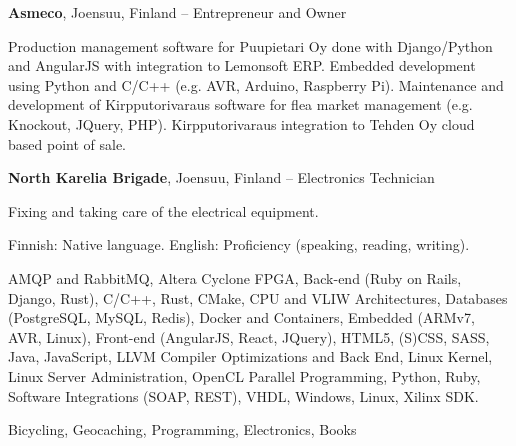 \documentclass[letterpaper,MMMyyyy,nonstopmode]{simpleresumecv}
\begin{document}
\begin{Body}
\BigGap
\Entry
\textbf{Asmeco}, Joensuu, Finland
\hfill
{} -- 
\Gap
\BulletItem Entrepreneur and Owner
\begin{Detail}
    \SubBulletItem Production management software for Puupietari Oy done with
    Django/Python and \newline AngularJS with integration to Lemonsoft ERP.
    \SubBulletItem Embedded development using Python and C/C++ (e.g. AVR,
    Arduino, Raspberry Pi).
    \SubBulletItem Maintenance and development of Kirpputorivaraus software for
    flea market \newline management (e.g. Knockout, JQuery, PHP).
    \SubBulletItem Kirpputorivaraus integration to Tehden Oy cloud based point
    of sale.
\end{Detail}

\newpage

\BigGap
\Entry
\textbf{North Karelia Brigade}, Joensuu, Finland
\hfill
{} -- 
\Gap
\BulletItem Electronics Technician
\begin{Detail}
    \SubBulletItem Fixing and taking care of the electrical equipment.
\end{Detail}



\BulletItem Finnish: Native language.
\Gap
\BulletItem English: Proficiency (speaking, reading, writing).



\Entry
\BulletItem AMQP and RabbitMQ,
\BulletItem Altera Cyclone FPGA,
\BulletItem Back-end (Ruby on Rails, Django, Rust),
\BulletItem C/C++,
\BulletItem Rust,
\BulletItem CMake,
\BulletItem CPU and VLIW Architectures,
\BulletItem Databases (PostgreSQL, MySQL, Redis),
\BulletItem Docker and Containers,
\BulletItem Embedded (ARMv7, AVR, Linux),
\BulletItem Front-end (AngularJS, React, JQuery),
\BulletItem HTML5, (S)CSS, SASS,
\BulletItem Java,
\BulletItem JavaScript,
\BulletItem LLVM Compiler Optimizations and Back End,
\BulletItem Linux Kernel,
\BulletItem Linux Server Administration,
\BulletItem OpenCL Parallel Programming,
\BulletItem Python,
\BulletItem Ruby,
\BulletItem Software Integrations (SOAP, REST),
\BulletItem VHDL,
\BulletItem Windows, Linux,
\BulletItem Xilinx SDK.



\Entry
Bicycling, Geocaching, Programming, Electronics, Books

\end{Body}
\end{document}
